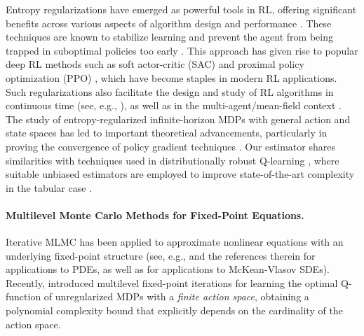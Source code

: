 \documentclass[11pt]{article}
\numberwithin{equation}{section}
\theoremstyle{definition}
\theoremstyle{remark}
\newcommand{\citep}{\cite}
\newcommand{\citet}{\cite}
\begin{document}
 


Entropy  regularizations have emerged as powerful tools in RL, offering significant benefits across various aspects of algorithm design and performance \citep{geist19atheory}. These techniques are known to stabilize learning \citep{ziebart2008maximum, reisinger2021regularity} and prevent the agent from being trapped in suboptimal policies too early \citep{fox2016tamingnoisereinforcementlearning}. This approach has given rise to popular deep RL methods such as soft actor-critic (SAC) \citep{haarnoja2018sac} and proximal policy optimization (PPO) \citep{schulman2017proximalpolicyoptimizationalgorithms}, which have become staples in modern RL applications. Such regularizations also facilitate the design and study of RL algorithms in continuous time 
(see, e.g., \citep{jia2022b, szpruch2024optimal}), as well as in the multi-agent/mean-field context \citep{cui2021approximately,anahtarci2023q,guo2022entropy}.
The study of entropy-regularized infinite-horizon MDPs with  general action and state spaces has led to important theoretical advancements, particularly in proving the convergence of policy gradient techniques \citep{cen2022fast, kerimkulov2023fisherrao}.
Our estimator shares similarities with techniques used in distributionally robust Q-learning \citep{liu2022distributionally,wang2023finite, wang2024samplecomplexityvariancereduceddistributionally}, where    suitable unbiased estimators 
are employed
to improve  state-of-the-art complexity in the tabular case \citep{wang2024samplecomplexityvariancereduceddistributionally}.

\paragraph{Multilevel Monte Carlo Methods for Fixed-Point Equations.}
Iterative MLMC has been applied  to approximate nonlinear equations with an underlying fixed-point structure 
(see, e.g., \citet{hutzenthaler2020overcoming, 
giles2019generalisedmultilevelpicardapproximations, hutzenthaler2021multilevel}
and the references therein for applications to PDEs,
  as well as \citet{szpruch2019multilevelSDE, hutzenthaler2022multilevel} for applications to McKean-Vlasov SDEs). 
Recently, \citet{beck2023nonlinearmontecarlomethods} introduced multilevel fixed-point iterations for learning the optimal Q-function of unregularized MDPs with a \emph{finite action space}, obtaining a polynomial complexity bound that explicitly depends on the cardinality of the action space.
\end{document}
